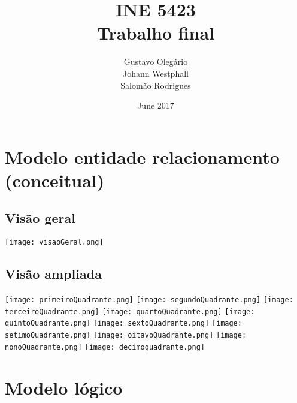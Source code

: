 \documentclass{article}
\title{INE 5423 \\ Trabalho final}
\author{Gustavo Olegário  \\ Johann Westphall \\ Salomão Rodrigues}
\date{June 2017}
\begin{document}
    \begin{titlepage}
        \maketitle
    \end{titlepage}
    
    
    \section{Modelo entidade relacionamento (conceitual)}
        \subsection{Visão geral}
        \texttt{[image: visaoGeral.png]}
        
        \subsection{Visão ampliada}
        \texttt{[image: primeiroQuadrante.png]}
        \texttt{[image: segundoQuadrante.png]}
        \texttt{[image: terceiroQuadrante.png]}
        \texttt{[image: quartoQuadrante.png]}
        \texttt{[image: quintoQuadrante.png]}
        \texttt{[image: sextoQuadrante.png]}
        \texttt{[image: setimoQuadrante.png]}
        \texttt{[image: oitavoQuadrante.png]}
        \texttt{[image: nonoQuadrante.png]}
        \texttt{[image: decimoquadrante.png]}
        
    \pagebreak
    \section{Modelo lógico}
    
\end{document}
